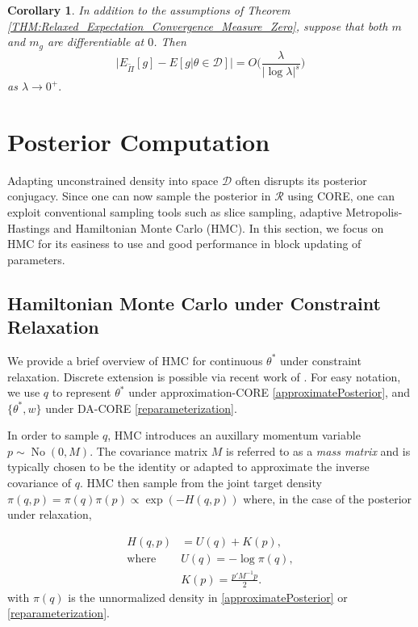 \documentclass[10pt,fleqn]{article}
\newtheorem{corollary}{Corollary}
\newcommand{\mc}[1]{\mathcal{#1}}
\DeclareMathOperator{\No}{No}
\DeclareMathOperator{\1}{\mathbbm{1}}
\newcommand{\mass}{M} %
\begin{document}
{\begin{corollary}
In addition to the assumptions of Theorem \ref{THM:Relaxed_Expectation_Convergence_Measure_Zero}, suppose that both $m$ and $m_g$ are differentiable at $0$. Then
$$\bigg|E_{\tilde{\Pi}}[g] - E[g|\theta \in \mathcal{D}] \bigg| = O\bigg(\frac{\lambda}{|\log \lambda|^s}\bigg)$$
as $\lambda \to 0^+.$
\end{corollary}

}
 
\section{Posterior Computation}

Adapting  unconstrained density into space $\mc D$ often disrupts its posterior conjugacy. Since one can now sample the posterior in $\mc R$ using
 CORE, one can exploit conventional sampling tools such as slice sampling, adaptive Metropolis-Hastings and Hamiltonian Monte Carlo (HMC). In this section, we focus on HMC for its easiness to use and good performance in block updating of parameters.

\subsection{Hamiltonian Monte Carlo under Constraint Relaxation}

We provide a brief overview of HMC for continuous $\theta^*$ under constraint relaxation. Discrete extension is possible via recent work of \cite{nishimura2017discontinuous}. For easy notation, we use $q$ to represent $\theta^*$ under approximation-CORE \eqref{approximatePosterior}, and $\{\theta^*, w\}$ under DA-CORE \eqref{reparameterization}.

In order to sample $q$, HMC introduces an auxillary momentum variable $p \sim \No(0, \mass)$. The covariance matrix $\mass$ is referred to as a \textit{mass matrix} and is typically chosen to be the identity or adapted to approximate the inverse covariance of $q$. HMC then sample from the joint target density $\pi(q, p) = \pi(q) \pi(p) \propto \exp (- H(q, p))$ where, in the case of the posterior under relaxation, 


\begin{equation}
\begin{aligned}
H(q, p)& = U(q)+K(p),\\
\text{where } & U(q) = -\log\pi(q),\\
& K(p) = \frac{p'\mass^{-1} p}{2}.
\end{aligned}
\end{equation}
with $\pi(q)$ is the unnormalized density in \eqref{approximatePosterior} or \eqref{reparameterization}. %
\end{document}
